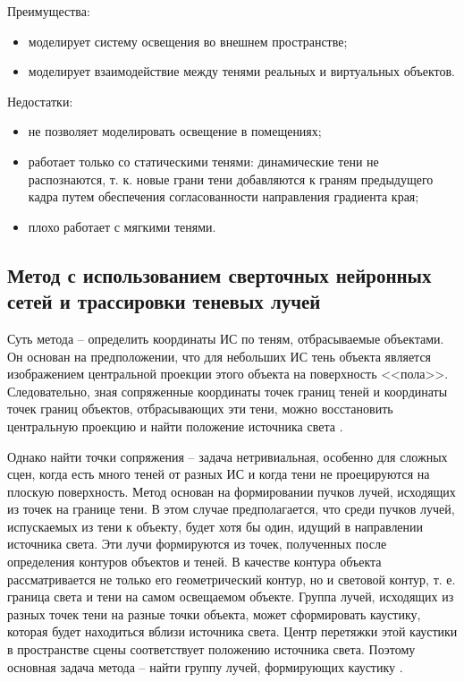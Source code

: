 Преимущества:
\begin{itemize}
	\item моделирует систему освещения во внешнем пространстве;
	\item моделирует взаимодействие между тенями реальных и виртуальных объектов.
\end{itemize}


Недостатки:
\begin{itemize}
	\item не позволяет моделировать освещение в помещениях;
	\item работает только со статическими тенями: динамические тени не распознаются, т. к. новые грани тени добавляются к граням предыдущего кадра путем обеспечения согласованности направления градиента края;
	\item плохо работает с мягкими тенями.
\end{itemize}


\subsection{Метод с использованием сверточных нейронных сетей и трассировки теневых лучей}

Суть метода -- определить координаты ИС по теням, отбрасываемые объектами. Он основан на предположении, что для небольших ИС тень объекта является изображением центральной проекции этого объекта на поверхность <<пола>>. Следовательно, зная сопряженные координаты точек границ теней и координаты точек границ объектов, отбрасывающих эти тени, можно восстановить центральную проекцию и найти положение источника света \cite{sns_tras}.

Однако найти точки сопряжения -- задача нетривиальная, особенно для сложных сцен, когда есть много теней от разных ИС и когда тени не проецируются на плоскую поверхность. Метод основан на формировании пучков лучей, исходящих из точек на границе тени. В этом случае предполагается, что среди пучков лучей, испускаемых из тени к объекту, будет хотя бы один, идущий в направлении источника света. Эти лучи формируются из точек, полученных после определения контуров объектов и теней. В качестве контура объекта рассматривается не только его геометрический контур, но и световой контур, т. е. граница света и тени на самом освещаемом объекте. Группа лучей, исходящих из разных точек тени на разные точки объекта, может сформировать каустику, которая будет находиться вблизи источника света. Центр перетяжки этой каустики в пространстве сцены соответствует положению источника света. Поэтому основная задача метода -- найти группу лучей, формирующих каустику \cite{sns_tras}.

